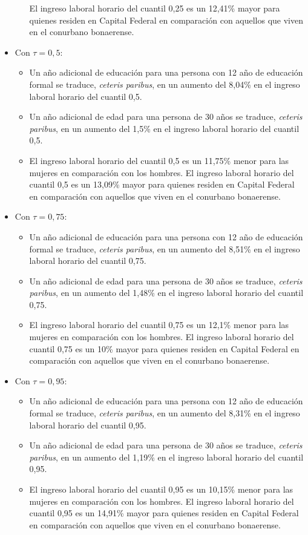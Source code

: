 \documentclass[11pt]{article}
\begin{document}
\begin{itemize}
\begin{itemize}
        El ingreso laboral horario del cuantil 0,25 es un 12,41\% mayor para quienes residen en Capital Federal en comparación con aquellos que viven en el conurbano bonaerense.
    \end{itemize}
    \item Con $\tau=0,5$:
    \begin{itemize}
        \item Un año adicional de educación para una persona con 12 año de educación formal se traduce, \emph{ceteris paribus}, en un aumento del 8,04\% en el ingreso laboral horario del cuantil 0,5.
        \item Un año adicional de edad para una persona de 30 años se traduce, \emph{ceteris paribus}, en un aumento del 1,5\% en el ingreso laboral horario del cuantil 0,5.
        \item El ingreso laboral horario del cuantil 0,5 es un 11,75\% menor para las mujeres en comparación con los hombres.
        El ingreso laboral horario del cuantil 0,5 es un 13,09\% mayor para quienes residen en Capital Federal en comparación con aquellos que viven en el conurbano bonaerense.
    \end{itemize}
    \item Con $\tau=0,75$:
    \begin{itemize}
        \item Un año adicional de educación para una persona con 12 año de educación formal se traduce, \emph{ceteris paribus}, en un aumento del 8,51\% en el ingreso laboral horario del cuantil 0,75.
        \item Un año adicional de edad para una persona de 30 años se traduce, \emph{ceteris paribus}, en un aumento del 1,48\% en el ingreso laboral horario del cuantil 0,75.
        \item El ingreso laboral horario del cuantil 0,75 es un 12,1\% menor para las mujeres en comparación con los hombres.
        El ingreso laboral horario del cuantil 0,75 es un 10\% mayor para quienes residen en Capital Federal en comparación con aquellos que viven en el conurbano bonaerense.
    \end{itemize}
    \item Con $\tau=0,95$:
    \begin{itemize}
        \item Un año adicional de educación para una persona con 12 año de educación formal se traduce, \emph{ceteris paribus}, en un aumento del 8,31\% en el ingreso laboral horario del cuantil 0,95.
        \item Un año adicional de edad para una persona de 30 años se traduce, \emph{ceteris paribus}, en un aumento del 1,19\% en el ingreso laboral horario del cuantil 0,95.
        \item El ingreso laboral horario del cuantil 0,95 es un 10,15\% menor para las mujeres en comparación con los hombres.
        El ingreso laboral horario del cuantil 0,95 es un 14,91\% mayor para quienes residen en Capital Federal en comparación con aquellos que viven en el conurbano bonaerense.
    \end{itemize}
\end{itemize}
\end{document}
